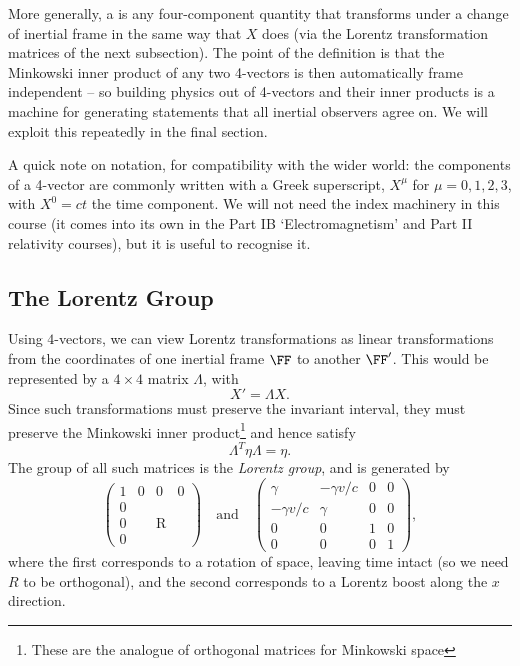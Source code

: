 \documentclass[a4paper]{scrartcl}
\begin{document}
More generally, a  is any four-component quantity that transforms under a change of inertial frame in the same way that $X$ does (via the Lorentz transformation matrices of the next subsection). The point of the definition is that the Minkowski inner product of any two 4-vectors is then automatically frame independent -- so building physics out of 4-vectors and their inner products is a machine for generating statements that all inertial observers agree on. We will exploit this repeatedly in the final section.

A quick note on notation, for compatibility with the wider world: the components of a 4-vector are commonly written with a Greek superscript, $X^\mu$ for $\mu = 0, 1, 2, 3$, with $X^0 = ct$ the time component. We will not need the index machinery in this course (it comes into its own in the Part IB `Electromagnetism' and Part II relativity courses), but it is useful to recognise it.

\subsection{The Lorentz Group}

Using $4$-vectors, we can view Lorentz transformations as linear transformations from the coordinates of one inertial frame $\FF$ to another $\FF'$. This would be represented by a $4 \times 4$ matrix $\Lambda$, with
$$
X' = \Lambda X.
$$
Since such transformations must preserve the invariant interval, they must preserve the Minkowski inner product\footnote{These are the analogue of orthogonal matrices for Minkowski space} and hence satisfy
$$
\Lambda^T \eta \Lambda = \eta.
$$
The group of all such matrices is the \emph{Lorentz group}, and is generated by 
$$
\left(\begin{array}{c|ccc}
	1 & 0 & 0 & 0 \\
	\hline 0 & & & \\
	0 & & \mathrm{R} & \\
	0 & & &
	\end{array}\right) 
	\quad \text{and} \quad \left(\begin{array}{cc|cc}
		\gamma & -\gamma v / c & 0 & 0 \\
		-\gamma v / c & \gamma & 0 & 0 \\
		\hline 0 & 0 & 1 & 0 \\
		0 & 0 & 0 & 1
		\end{array}\right),
$$
where the first corresponds to a rotation of space, leaving time intact (so we need $R$ to be orthogonal), and the second corresponds to a Lorentz boost along the $x$ direction.
\end{document}
